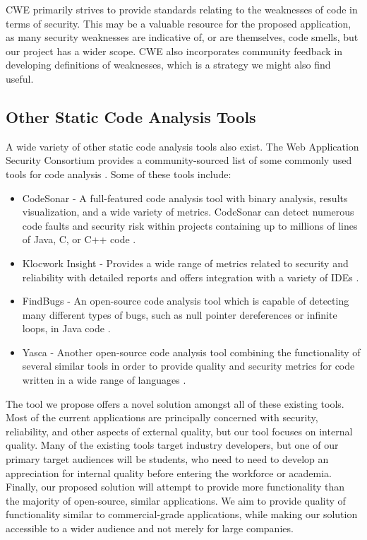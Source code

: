 \documentclass{sig-alternate}
\begin{document}
CWE primarily strives to provide standards relating to the weaknesses of code in terms of security. This may be a valuable resource for the proposed application, as many security weaknesses are indicative of, or are themselves, code smells, but our project has a wider scope. CWE also incorporates community feedback in developing definitions of weaknesses, which is a strategy we might also find useful.

\subsection{Other Static Code Analysis Tools}
A wide variety of other static code analysis tools also exist. The Web Application Security Consortium provides a community-sourced list of some commonly used tools for code analysis \cite{webappsec2012}. Some of these tools include:

\begin{itemize}
\item CodeSonar - A full-featured code analysis tool with binary analysis, results visualization, and a wide variety of metrics. CodeSonar can detect numerous code faults and security risk within projects containing up to millions of lines of Java, C, or C++ code \cite{grammatech2013codesonar}.
\item Klocwork Insight - Provides a wide range of metrics related to security and reliability with detailed reports and offers integration with a variety of IDEs \cite{klocwork2013insight}.
\item FindBugs - An open-source code analysis tool which is capable of detecting many different types of bugs, such as null pointer dereferences or infinite loops, in Java code \cite{pugh2013findbugs}.
\item Yasca - Another open-source code analysis tool combining the functionality of several similar tools in order to provide quality and security metrics for code written in a wide range of languages \cite{scovetta2007yasca}.
\end{itemize}

The tool we propose offers a novel solution amongst all of these existing tools. Most of the current applications are principally concerned with security, reliability, and other aspects of external quality, but our tool focuses on internal quality. Many of the existing tools target industry developers, but one of our primary target audiences will be students, who need to need to develop an appreciation for internal quality before entering the workforce or academia. Finally, our proposed solution will attempt to provide more functionality than the majority of open-source, similar applications. We aim to provide quality of functionality similar to commercial-grade applications, while making our solution accessible to a wider audience and not merely for large companies. 
\end{document}
